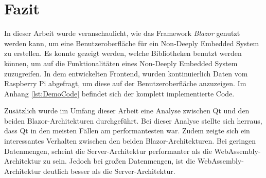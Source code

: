 \chapter{Fazit}
\label{chp:fazit}
In dieser Arbeit wurde veranschaulicht, wie das Framework \emph{Blazor} genutzt werden
kann, um eine Benutzeroberfläche für ein Non-Deeply Embedded System zu erstellen. Es konnte
gezeigt werden, welche Bibliotheken benutzt werden können, um auf die Funktionalitäten eines
Non-Deeply Embedded System zuzugreifen. In dem entwickelten Frontend, wurden kontinuierlich Daten
vom Raspberry Pi abgefragt, um diese auf der Benutzeroberfläche anzuzeigen. Im Anhang
\ref{lst:DemoCode} befindet sich der komplett implementierte Code.

Zusätzlich wurde im Umfang dieser Arbeit eine Analyse zwischen Qt und den beiden
Blazor-Architekturen durchgeführt. Bei dieser Analyse stellte sich herraus, dass Qt in den
meisten Fällen am performantesten war. Zudem zeigte sich ein interessantes
Verhalten zwischen den beiden Blazor-Architekturen. Bei geringen Datenmengen, scheint die
Server-Architektur performanter als die WebAssembly-Architektur zu sein. Jedoch bei großen
Datenmengen, ist die WebAssembly-Architektur deutlich besser als die Server-Architektur.